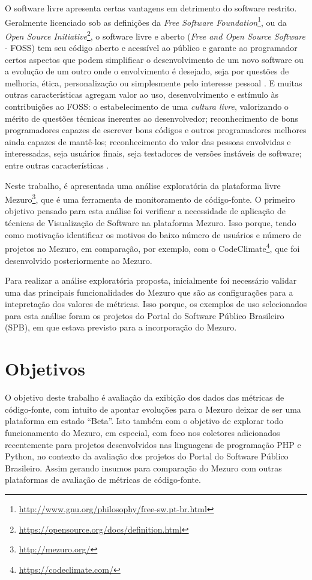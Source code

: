 O software livre apresenta certas vantagens em detrimento do software restrito.
Geralmente licenciado sob as definições da
\textit{Free Software Foundation}\footnote{\url{http://www.gnu.org/philosophy/free-sw.pt-br.html}},
ou da \textit{Open Source Initiative}\footnote{\url{https://opensource.org/docs/definition.html}},
o software livre e aberto (\textit{Free and Open Source Software} - FOSS) tem
seu código aberto e acessível ao público e garante ao programador certos
aspectos que podem simplificar o desenvolvimento de um novo software ou a
evolução de um outro onde o envolvimento é desejado, seja por questões de
melhoria, ética, personalização ou simplesmente pelo interesse pessoal
\cite{meirelles2013monitoramento}. E muitas outras características agregam
valor ao uso, desenvolvimento e estímulo às contribuições ao FOSS: o
estabelecimento de uma \textit{cultura livre}, valorizando o mérito de questões
técnicas inerentes ao desenvolvedor; reconhecimento de bons programadores
capazes de escrever bons códigos e outros programadores melhores ainda capazes de
mantê-los; reconhecimento do valor das pessoas envolvidas e interessadas, seja
usuários finais, seja testadores de versões instáveis de software; entre outras
características \cite{raymond1999cathedral}.

Neste trabalho, é apresentada uma análise exploratória da plataforma livre
Mezuro\footnote{\url{http://mezuro.org/}}, que é uma ferramenta de monitoramento
de código-fonte. O primeiro objetivo pensado para esta análise foi verificar a
necessidade de aplicação de técnicas de Visualização de Software na plataforma
Mezuro. Isso porque, tendo como motivação identificar os motivos do
baixo número de usuários e número de projetos no Mezuro, em comparação, por
exemplo, com o CodeClimate\footnote{\url{https://codeclimate.com/}}, que foi
desenvolvido posteriormente ao Mezuro.

Para realizar a análise exploratória proposta, inicialmente foi necessário
validar uma das principais funcionalidades do Mezuro que são as configurações
para a intepretação dos valores de métricas. Isso porque, os exemplos de uso
selecionados para esta análise foram os projetos do Portal do Software
Público Brasileiro (SPB), em que estava previsto para a incorporação do Mezuro.

\section{Objetivos}

O objetivo deste trabalho é avaliação da exibição dos dados das métricas de
código-fonte, com intuito de apontar evoluções para o Mezuro deixar de ser uma
plataforma em estado ``Beta''.
%
Isto também com o objetivo de explorar todo funcionamento do Mezuro, em especial,
com foco nos coletores adicionados recentemente para projetos desenvolvidos nas
linguagens de programação PHP e Python, no contexto da avaliação dos projetos do
Portal do Software Público Brasileiro.
%
Assim gerando insumos para comparação do Mezuro com outras plataformas de
avaliação de métricas de código-fonte.

